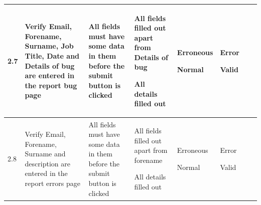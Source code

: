 \begin{landscape}
\begin{center}
\begin{longtable}{|p{1.5cm}|p{2.5cm}|p{2.5cm}|p{4cm}|p{2cm}|p{2cm}|p{1cm}|p{1cm}|}
2.7 & Verify Email, Forename, Surname, Job Title, Date and Details of bug are entered in the report bug page & All fields must have some data in them before the submit  button is clicked & All fields filled out apart from Details of bug \par \bigskip All details filled out & Erroneous \par \bigskip \bigskip Normal & Error \par\bigskip \bigskip Valid && \\ \hline
2.8 & Verify Email, Forename, Surname and description are entered in the report errors page & All fields must have some data in them before the submit  button is clicked & All fields filled out apart from forename \par \bigskip All details filled out & Erroneous \par \bigskip \bigskip Normal & Error \par \bigskip \bigskip Valid && \\ \hline


\end{longtable}
\end{center}
\end{landscape}
